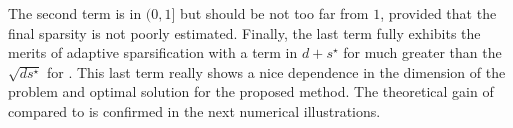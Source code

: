 The second term is in $(0,1]$ but should be not too far from $1$, provided that the final sparsity is not poorly estimated. Finally, the last term fully exhibits the merits of adaptive sparsification with a term in $d + s^\star $ for \dave much greater than the $\sqrt{ds^\star}$ for \recoalgo. This last term really shows a nice dependence in the dimension of the problem and optimal solution for the proposed method. The theoretical gain of \recoalgo compared to \dave is confirmed in the next numerical illustrations.